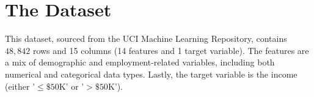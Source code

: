 \vspace{2 \baselineskip}
\section{The Dataset}
This dataset, sourced from the UCI Machine Learning Repository, contains $48,842$ rows and 15 columns (14 features and 1 target variable). The features are a mix of demographic and employment-related variables, including both numerical and categorical data types. Lastly, the target variable is the income (either '$\le\$50\text{K}$' or '$>\$50\text{K}$').

\vspace{2 \baselineskip}
